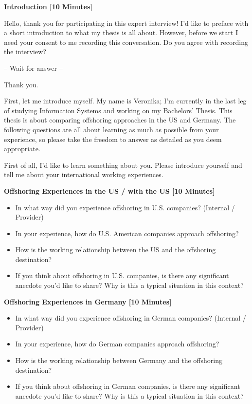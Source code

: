 \begin{appendix}
\label{app:InterviewStructure}

{\bf Introduction [10 Minutes]}

Hello, thank you for participating in this expert interview! I’d like to preface with a short introduction to what my thesis is all about. However, before we start I need your consent to me recording this conversation. Do you agree with recording the interview?

 – Wait for answer –
 
Thank you.

First, let me introduce myself. My name is Veronika; I’m currently in the last leg of studying Information Systems and working on my Bachelors’ Thesis. This thesis is about comparing offshoring approaches in the US and Germany. 
The following questions are all about learning as much as possible from your experience, so please take the freedom to answer as detailed as you deem appropriate.

First of all, I’d like to learn something about you. Please introduce yourself and tell me about your international working experiences.

{\bf Offshoring   Experiences in the US / with the US [10 Minutes]}
\begin{itemize}
	\item In what way did you experience offshoring in U.S. companies? (Internal / Provider)
	\item In your experience, how do U.S. American companies approach offshoring?
	\item How is the working relationship between the US and the offshoring destination?
	\item If you think about offshoring in U.S. companies, is there any significant anecdote you’d like to share? Why is this a typical situation in this context?
\end{itemize}
	
{\bf Offshoring Experiences in Germany [10 Minutes]}

\begin{itemize}
	\item In what way did you experience offshoring in German companies? (Internal / Provider)
	\item In your experience, how do German companies approach offshoring?
	\item How is the working relationship between Germany and the offshoring destination?
	\item If you think about offshoring in German companies, is there any significant anecdote you’d like to share? Why is this a typical situation in this context?
\end{itemize}


\end{appendix}
